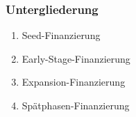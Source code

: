 \begin{refsection}
  \subsubsection*{Untergliederung}
  \begin{enumerate}
    \item Seed-Finanzierung
    \item Early-Stage-Finanzierung
    \item Expansion-Finanzierung
    \item Spätphasen-Finanzierung
  \end{enumerate}

\end{refsection}
